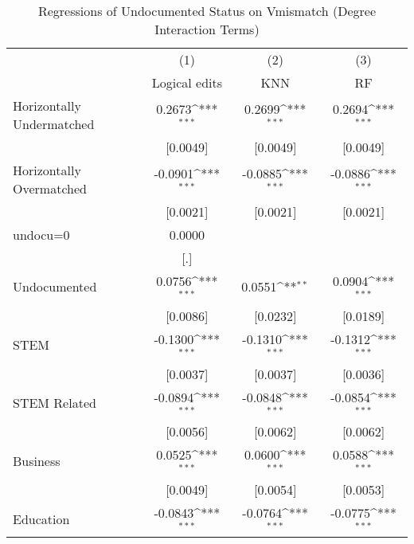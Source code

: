 \begin{table}[htbp]\centering
\def\sym#1{\ifmmode^{#1}\else\(^{#1}\)\fi}
\caption{Regressions of Undocumented Status on Vmismatch (Degree Interaction Terms)}
\begin{tabular}{l*{3}{c}}
\toprule
                    &\multicolumn{1}{c}{(1)}         &\multicolumn{1}{c}{(2)}         &\multicolumn{1}{c}{(3)}         \\
                    &Logical edits         &         KNN         &          RF         \\
\midrule
Horizontally Undermatched&      0.2673\sym{***}&      0.2699\sym{***}&      0.2694\sym{***}\\
                    &    [0.0049]         &    [0.0049]         &    [0.0049]         \\
\addlinespace
Horizontally Overmatched&     -0.0901\sym{***}&     -0.0885\sym{***}&     -0.0886\sym{***}\\
                    &    [0.0021]         &    [0.0021]         &    [0.0021]         \\
\addlinespace
undocu=0            &      0.0000         &                     &                     \\
                    &         [.]         &                     &                     \\
\addlinespace
Undocumented        &      0.0756\sym{***}&      0.0551\sym{**} &      0.0904\sym{***}\\
                    &    [0.0086]         &    [0.0232]         &    [0.0189]         \\
\addlinespace
STEM                &     -0.1300\sym{***}&     -0.1310\sym{***}&     -0.1312\sym{***}\\
                    &    [0.0037]         &    [0.0037]         &    [0.0036]         \\
\addlinespace
STEM Related        &     -0.0894\sym{***}&     -0.0848\sym{***}&     -0.0854\sym{***}\\
                    &    [0.0056]         &    [0.0062]         &    [0.0062]         \\
\addlinespace
Business            &      0.0525\sym{***}&      0.0600\sym{***}&      0.0588\sym{***}\\
                    &    [0.0049]         &    [0.0054]         &    [0.0053]         \\
\addlinespace
Education           &     -0.0843\sym{***}&     -0.0764\sym{***}&     -0.0775\sym{***}\\

\end{tabular}
\end{table}
